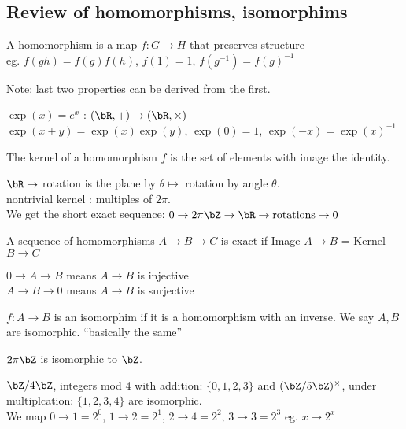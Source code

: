 \subsection{Review of homomorphisms, isomorphims} 

\begin{definition}
    A homomorphism is a map $f : G \to H$ that preserves structure \\
    eg. $f(gh)=f(g)f(h)$, $f(1)=1$, $f(g^{-1}) = f(g)^{-1}$ 
\end{definition}
Note: last two properties can be derived from the first. 

\begin{example}
    $\exp(x)=e^x$ : $(\bR, +) \to (\bR, \times)$ \\
    $\exp(x+y)=\exp(x)\exp(y)$, $\exp(0)=1$, $\exp(-x)=\exp(x)^{-1}$
\end{example}

\begin{definition}
    The kernel of a homomorphism $f$ is the set of elements with image the identity. 
\end{definition}

\begin{example}
    $\bR \to $ rotation is the plane by $\theta \mapsto$ rotation by angle $\theta$. \\
    nontrivial kernel : multiples of $2 \pi$. \\
    We get the short exact sequence: $0 \to 2\pi\bZ \to \bR \to \text{rotations} \to 0$ 
\end{example}

\begin{definition}
    A sequence of homomorphisms $A \to B \to C$ is exact if Image $A \to B$ = Kernel $B \to C$
\end{definition}
$0 \to A \to B$ means $A \to B$ is injective \\
$A \to B \to 0$ means $A \to B$ is surjective 

\begin{definition}
    $f : A \to B$ is an isomorphim if it is a homomorphism with an inverse. We say $A,B$ are isomorphic. ``basically the same''
\end{definition}

\begin{example}
    $2 \pi \bZ$ is isomorphic to $\bZ$.
\end{example}

\begin{example}
    $\bZ/4\bZ$, integers mod 4 with addition: $\{0, 1, 2, 3\}$ and $(\bZ/5\bZ)^{\times}$, under multiplcation: $\{1, 2, 3, 4 \}$ are isomorphic. \\
    We map $0 \to 1=2^0$, $1 \to 2 = 2^1$, $2 \to 4=2^2$, $3 \to 3= 2^3$    eg. $x \mapsto 2^x$
\end{example}

